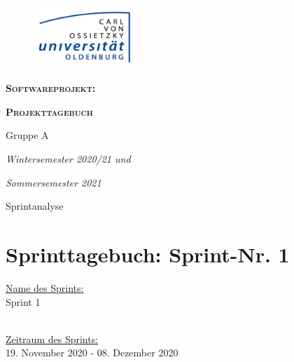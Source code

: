 \documentclass[12pt,a4paper, oneside]{article}
\author{Uni Oldenburg, SWP2020 Gruppe A}
\begin{document}
    \begin{titlepage}
        \pagestyle{empty}
        \begin{center}

            \begin{figure}[h]
                \centering
                \includegraphics[width=0.35\textwidth]{img/Logo.jpg}
            \end{figure}

            \bigskip \bigskip \noindent
            \textsc{\textbf{\LARGE Softwareprojekt:}} \par \bigskip \noindent
            \textsc{\textbf{\LARGE Projekttagebuch}}


            \par \bigskip \bigskip \bigskip \bigskip \bigskip \noindent
            {\Large Gruppe A} \par \medskip \noindent

            \par \bigskip \bigskip \bigskip \bigskip \bigskip \bigskip \noindent
            \textit{\Large Wintersemester 2020/21 und} \par \noindent
            \textit{\Large Sommersemester 2021}

            \par \bigskip \bigskip \bigskip \bigskip \bigskip \bigskip \noindent
            \par \bigskip \bigskip \bigskip \noindent
            {\Large Sprintanalyse} \par \medskip \noindent

        \end{center}
    \end{titlepage}

    \tableofcontents
    \pagebreak



    \section{Sprinttagebuch: Sprint-Nr. 1}
    \underline{Name des Sprints:}
    \\
    Sprint 1

    \noindent
    \\
    \underline{Zeitraum des Sprints:}
    \\
    19. November 2020 - 08. Dezember 2020
\end{document}
